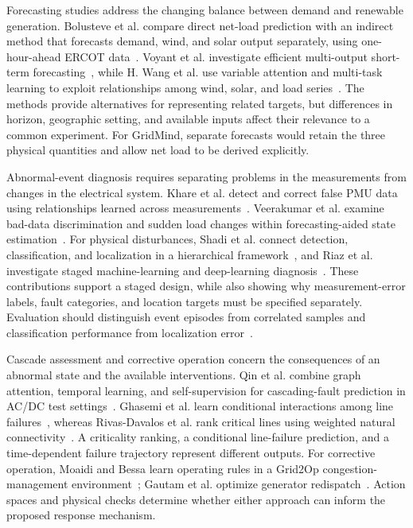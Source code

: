 \documentclass[journal,letterpaper]{IEEEtran}
\begin{document}
Forecasting studies address the changing balance between demand and renewable generation. Bolusteve et al. compare direct net-load prediction with an indirect method that forecasts demand, wind, and solar output separately, using one-hour-ahead ERCOT data~\cite{S25}. Voyant et al. investigate efficient multi-output short-term forecasting~\cite{S20}, while H. Wang et al. use variable attention and multi-task learning to exploit relationships among wind, solar, and load series~\cite{S24}. The methods provide alternatives for representing related targets, but differences in horizon, geographic setting, and available inputs affect their relevance to a common experiment. For GridMind, separate forecasts would retain the three physical quantities and allow net load to be derived explicitly.

Abnormal-event diagnosis requires separating problems in the measurements from changes in the electrical system. Khare et al. detect and correct false PMU data using relationships learned across measurements~\cite{S10}. Veerakumar et al. examine bad-data discrimination and sudden load changes within forecasting-aided state estimation~\cite{S18}. For physical disturbances, Shadi et al. connect detection, classification, and localization in a hierarchical framework~\cite{S11}, and Riaz et al. investigate staged machine-learning and deep-learning diagnosis~\cite{S16}. These contributions support a staged design, while also showing why measurement-error labels, fault categories, and location targets must be specified separately. Evaluation should distinguish event episodes from correlated samples and classification performance from localization error~\cite{S12}.

Cascade assessment and corrective operation concern the consequences of an abnormal state and the available interventions. Qin et al. combine graph attention, temporal learning, and self-supervision for cascading-fault prediction in AC/DC test settings~\cite{N02}. Ghasemi et al. learn conditional interactions among line failures~\cite{S02}, whereas Rivas-Davalos et al. rank critical lines using weighted natural connectivity~\cite{S03}. A criticality ranking, a conditional line-failure prediction, and a time-dependent failure trajectory represent different outputs. For corrective operation, Moaidi and Bessa learn operating rules in a Grid2Op congestion-management environment~\cite{S08}; Gautam et al. optimize generator redispatch~\cite{S09}. Action spaces and physical checks determine whether either approach can inform the proposed response mechanism.
\end{document}
